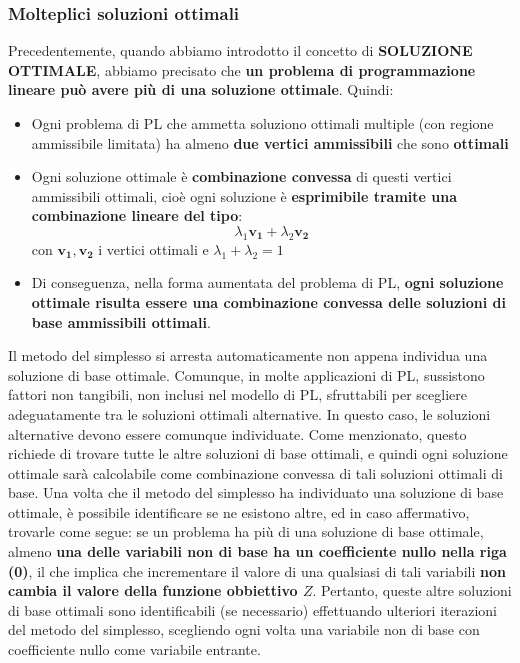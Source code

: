 \documentclass[12pt]{article}
\begin{document}
\subsubsection{Molteplici soluzioni ottimali}
Precedentemente, quando abbiamo introdotto il concetto di \textbf{SOLUZIONE OTTIMALE}, abbiamo precisato che \textbf{un problema di programmazione lineare può avere più di una soluzione ottimale}.
Quindi:
\begin{itemize}
    \item Ogni problema di PL che ammetta soluziono ottimali multiple (con regione ammissibile limitata) ha almeno \textbf{due vertici ammissibili} che sono \textbf{ottimali}
    \item Ogni soluzione ottimale è \textbf{combinazione convessa} di questi vertici ammissibili ottimali, cioè ogni soluzione è \textbf{esprimibile tramite una combinazione lineare del tipo}:
    $$\lambda_1 \boldsymbol{v_1} + \lambda_2 \boldsymbol{v_2}$$
    con $\boldsymbol{v_1}, \boldsymbol{v_2}$ i vertici ottimali e $\lambda_1 + \lambda_2 = 1$
    \item Di conseguenza, nella forma aumentata del problema di PL, \textbf{ogni soluzione ottimale risulta essere una combinazione convessa delle soluzioni di base ammissibili ottimali}.
\end{itemize}
Il metodo del simplesso si arresta automaticamente non appena individua una soluzione di base ottimale.
Comunque, in molte applicazioni di PL, sussistono fattori non tangibili, non inclusi nel modello di PL, sfruttabili per scegliere adeguatamente tra le soluzioni ottimali alternative. In questo caso, le soluzioni alternative devono essere comunque individuate.
Come menzionato, questo richiede di trovare tutte le altre soluzioni di base ottimali, e quindi ogni soluzione ottimale sarà calcolabile come combinazione convessa di tali soluzioni ottimali di base.
Una volta che il metodo del simplesso ha individuato una soluzione di base ottimale, è possibile identificare se ne esistono altre, ed in caso affermativo, trovarle come segue: se un problema ha più di una soluzione di base ottimale,
almeno \textbf{una delle variabili non di base ha un coefficiente nullo nella riga (0)}, il che implica che incrementare il valore di una qualsiasi di tali variabili \textbf{non cambia il valore della funzione obbiettivo $Z$}. Pertanto, queste altre
soluzioni di base ottimali sono identificabili (se necessario) effettuando ulteriori iterazioni del metodo del simplesso, scegliendo ogni volta una variabile non di base con coefficiente nullo come variabile entrante.
\end{document}

